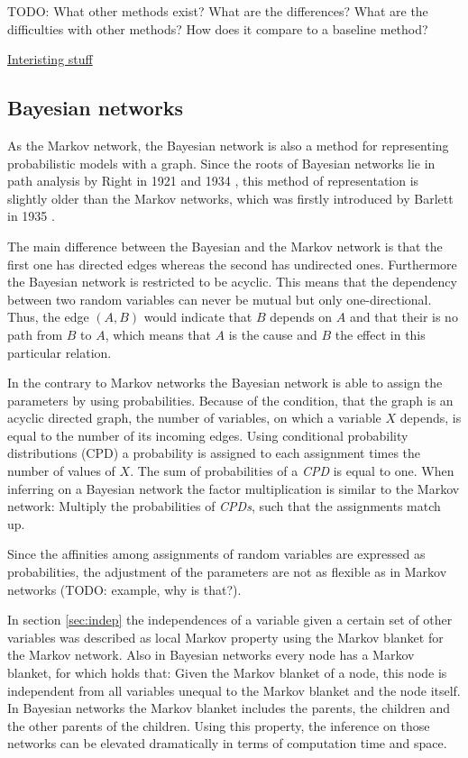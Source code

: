 TODO: What other methods exist? What are the differences? What are the difficulties with other methods? How does it compare to a baseline method?

\href{https://www.math.leidenuniv.nl/scripties/BSC-Obbens.pdf}{Interisting stuff} \cite{obbens2014inference}

\subsection{Bayesian networks} \label{sec:bayes}

As the Markov network, the Bayesian network is also a method for representing probabilistic models with a graph. Since the roots of Bayesian networks lie in path analysis by Right in 1921 \cite{wright1921correlation} and 1934 \cite{wright1934method}, this method of representation is slightly older than the Markov networks, which was firstly introduced by Barlett in 1935 \cite{bartlett1935contingency}.

The main difference between the Bayesian and the Markov network is that the first one has directed edges whereas the second has undirected ones. Furthermore the Bayesian network is restricted to be acyclic. This means that the dependency between two random variables can never be mutual but only one-directional. Thus, the edge $(A, B)$ would indicate that $B$ depends on $A$ and that their is no path from $B$ to $A$, which means that $A$ is the cause and $B$ the effect in this particular relation.

In the contrary to Markov networks the Bayesian network is able to assign the parameters by using probabilities. Because of the condition, that the graph is an acyclic directed graph, the number of variables, on which a variable $X$ depends, is equal to the number of its incoming edges. Using conditional probability distributions (CPD) a probability is assigned to each assignment times the number of values of $X$. The sum of probabilities of a \textit{CPD} is equal to one. When inferring on a Bayesian network the factor multiplication is similar to the Markov network: Multiply the probabilities of \textit{CPDs}, such that the assignments match up. 

Since the affinities among assignments of random variables are expressed as probabilities, the adjustment of the parameters are not as flexible as in Markov networks (TODO: example, why is that?).

In section \ref{sec:indep} the independences of a variable given a certain set of other variables was described as local Markov property using the Markov blanket for the Markov network. Also in Bayesian networks every node has a Markov blanket, for which holds that: Given the Markov blanket of a node, this node is independent from all variables unequal to the Markov blanket and the node itself. In Bayesian networks the Markov blanket includes the parents, the children and the other parents of the children. Using this property, the inference on those networks can be elevated dramatically in terms of computation time and space.


